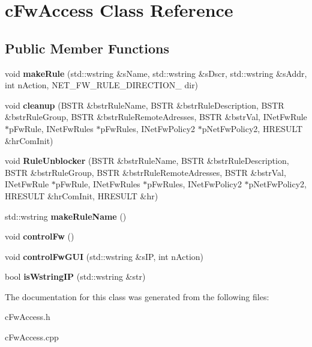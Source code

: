 \hypertarget{classc_fw_access}{}\section{c\+Fw\+Access Class Reference}
\label{classc_fw_access}
\subsection*{Public Member Functions}
\begin{DoxyCompactItemize}
\item 
\hypertarget{classc_fw_access_a08e2e69a2e96eed18f77c25819d467d4}{}void {\bfseries make\+Rule} (std\+::wstring \&s\+Name, std\+::wstring \&s\+Dscr, std\+::wstring \&s\+Addr, int n\+Action, N\+E\+T\+\_\+\+F\+W\+\_\+\+R\+U\+L\+E\+\_\+\+D\+I\+R\+E\+C\+T\+I\+O\+N\+\_\+ dir)\label{classc_fw_access_a08e2e69a2e96eed18f77c25819d467d4}

\item 
\hypertarget{classc_fw_access_a9eb66aa7d36c526b6617e69bead57915}{}void {\bfseries cleanup} (B\+S\+T\+R \&bstr\+Rule\+Name, B\+S\+T\+R \&bstr\+Rule\+Description, B\+S\+T\+R \&bstr\+Rule\+Group, B\+S\+T\+R \&bstr\+Rule\+Remote\+Adresses, B\+S\+T\+R \&bstr\+Val, I\+Net\+Fw\+Rule $\ast$p\+Fw\+Rule, I\+Net\+Fw\+Rules $\ast$p\+Fw\+Rules, I\+Net\+Fw\+Policy2 $\ast$p\+Net\+Fw\+Policy2, H\+R\+E\+S\+U\+L\+T \&hr\+Com\+Init)\label{classc_fw_access_a9eb66aa7d36c526b6617e69bead57915}

\item 
\hypertarget{classc_fw_access_a26b6363cd83d1d54a318030e35552a6b}{}void {\bfseries Rule\+Unblocker} (B\+S\+T\+R \&bstr\+Rule\+Name, B\+S\+T\+R \&bstr\+Rule\+Description, B\+S\+T\+R \&bstr\+Rule\+Group, B\+S\+T\+R \&bstr\+Rule\+Remote\+Adresses, B\+S\+T\+R \&bstr\+Val, I\+Net\+Fw\+Rule $\ast$p\+Fw\+Rule, I\+Net\+Fw\+Rules $\ast$p\+Fw\+Rules, I\+Net\+Fw\+Policy2 $\ast$p\+Net\+Fw\+Policy2, H\+R\+E\+S\+U\+L\+T \&hr\+Com\+Init, H\+R\+E\+S\+U\+L\+T \&hr)\label{classc_fw_access_a26b6363cd83d1d54a318030e35552a6b}

\item 
\hypertarget{classc_fw_access_aefabb6d98360ce5ab95d14d2cc1bd896}{}std\+::wstring {\bfseries make\+Rule\+Name} ()\label{classc_fw_access_aefabb6d98360ce5ab95d14d2cc1bd896}

\item 
\hypertarget{classc_fw_access_a6519f8ac419fcba5c037f514c2aea71b}{}void {\bfseries control\+Fw} ()\label{classc_fw_access_a6519f8ac419fcba5c037f514c2aea71b}

\item 
\hypertarget{classc_fw_access_a8e969eb55aa4a9ca9af1710eb1bfb0ce}{}void {\bfseries control\+Fw\+G\+U\+I} (std\+::wstring \&s\+I\+P, int n\+Action)\label{classc_fw_access_a8e969eb55aa4a9ca9af1710eb1bfb0ce}

\item 
\hypertarget{classc_fw_access_aa7b74e8ac58298c2582e3e2f5bd3265d}{}bool {\bfseries is\+Wstring\+I\+P} (std\+::wstring \&str)\label{classc_fw_access_aa7b74e8ac58298c2582e3e2f5bd3265d}

\end{DoxyCompactItemize}


The documentation for this class was generated from the following files\+:\begin{DoxyCompactItemize}
\item 
c\+Fw\+Access.\+h\item 
c\+Fw\+Access.\+cpp\end{DoxyCompactItemize}
